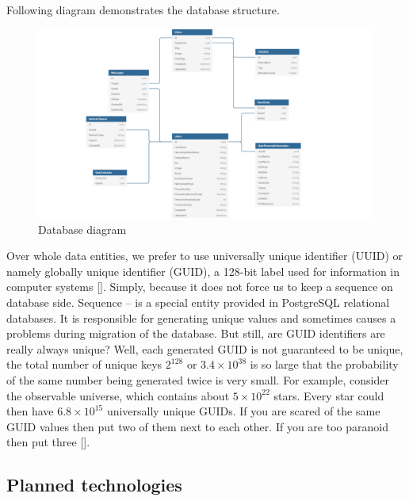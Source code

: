 Following diagram demonstrates the database structure.
\begin{figure}[H]
    \centering
    \includegraphics[width=1.2\textwidth]{Pictures/DB_diagram}
    \caption{Database diagram}\label{fig:figure5}
\end{figure}
Over whole data entities, we prefer to use universally unique identifier (UUID) or namely globally unique identifier (GUID),
a 128-bit label used for information in computer systems [\cite{leach2005universally}].
Simply, because it does not force us to keep a sequence on database side.
Sequence -- is a special entity provided in PostgreSQL relational databases.
It is responsible for generating unique values and sometimes causes a problems during migration of the database.
But still, are GUID identifiers are really always unique?
Well, each generated GUID is not guaranteed to be unique, the total number of unique keys $2^{128}$ or $3.4 \times 10^{38}$
is so large that the probability of the same number being generated twice is very small.
For example, consider the observable universe, which contains about $5 \times 10^{22}$ stars.
Every star could then have $6.8 \times 10^{15}$ universally unique GUIDs.
If you are scared of the same GUID values then put two of them next to each other.
If you are too paranoid then put three [\cite{GUIDSo}].

\subsection{Planned technologies}\label{subsec:planned-technologies}
